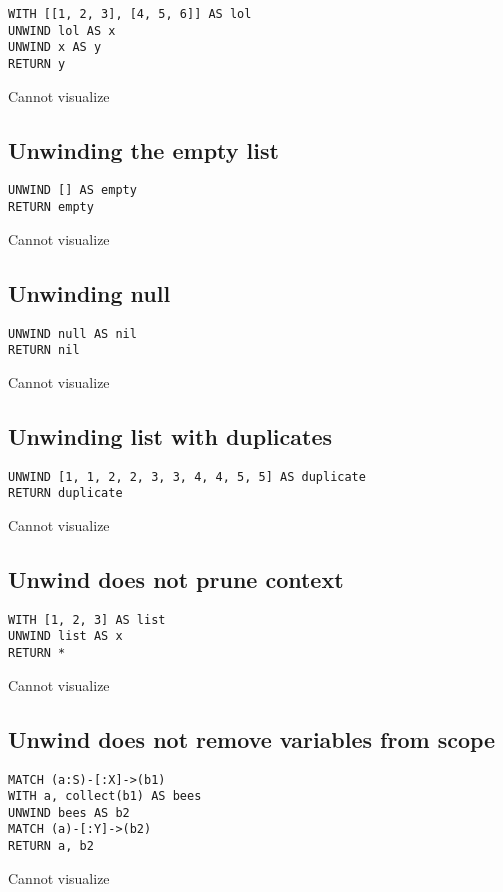 \begin{lstlisting}
WITH [[1, 2, 3], [4, 5, 6]] AS lol
UNWIND lol AS x
UNWIND x AS y
RETURN y
\end{lstlisting}

Cannot visualize
\subsection{Unwinding the empty list}

\begin{lstlisting}
UNWIND [] AS empty
RETURN empty
\end{lstlisting}

Cannot visualize
\subsection{Unwinding null}

\begin{lstlisting}
UNWIND null AS nil
RETURN nil
\end{lstlisting}

Cannot visualize
\subsection{Unwinding list with duplicates}

\begin{lstlisting}
UNWIND [1, 1, 2, 2, 3, 3, 4, 4, 5, 5] AS duplicate
RETURN duplicate
\end{lstlisting}

Cannot visualize
\subsection{Unwind does not prune context}

\begin{lstlisting}
WITH [1, 2, 3] AS list
UNWIND list AS x
RETURN *
\end{lstlisting}

Cannot visualize
\subsection{Unwind does not remove variables from scope}

\begin{lstlisting}
MATCH (a:S)-[:X]->(b1)
WITH a, collect(b1) AS bees
UNWIND bees AS b2
MATCH (a)-[:Y]->(b2)
RETURN a, b2
\end{lstlisting}

Cannot visualize
